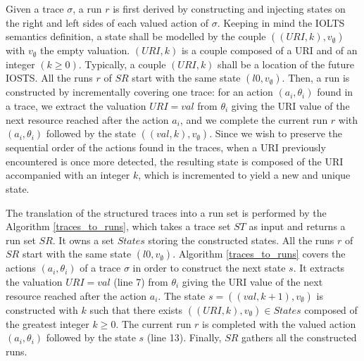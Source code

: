 Given a trace $\sigma$, a run $r$ is first derived by
constructing and injecting states on the right and left sides of
each valued action of $\sigma$. Keeping in mind the IOLTS
semantics definition, a state shall be modelled by the couple
$((URI,k),v_\emptyset)$ with $v_\emptyset$ the empty valuation.
$(URI,k)$ is a couple composed of a URI and of an integer $(k
\geq 0)$. Typically, a couple $(URI,k)$ shall be a location of
the future IOSTS. All the runs $r$ of $SR$ start with the same
state $(l0,v_\emptyset)$. Then, a run is constructed by
incrementally covering one trace: for an action $(a_i,\theta_i)$
found in a trace, we extract the valuation $URI=val$ from
$\theta_i$ giving the URI value of the next resource reached
after the action $a_i$, and we complete the current run $r$ with
$(a_i,\theta_i)$ followed by the state $((val,k),v_\emptyset)$.
Since we wish to preserve the sequential order of the actions
found in the traces, when a URI previously encountered is once
more detected, the resulting state is composed of the URI
accompanied with an integer $k$, which is incremented to yield a
new and unique state.

The translation of the structured traces into a run set is
performed by the Algorithm \ref{traces_to_runs}, which takes a
trace set $ST$ as input and returns a run set $SR$. It owns a
set $States$ storing the constructed states. All the runs $r$ of
$SR$ start with the same state $(l0,v_\emptyset)$. Algorithm
\ref{traces_to_runs} covers the actions $(a_i,\theta_i)$ of a
trace $\sigma$ in order to construct the next state $s$. It
extracts the valuation $URI=val$ (line 7) from $\theta_i$ giving
the URI value of the next resource reached after the action
$a_i$. The state $s=((val,k+1),v_\emptyset)$ is constructed with
$k$ such that there exists $((URI,k),v_\emptyset) \in States$
composed of the greatest integer $k \geq 0$. The current run $r$
is completed with the valued action $(a_i,\theta_i)$ followed by
the state $s$ (line 13). Finally, $SR$ gathers all the
constructed runs.

